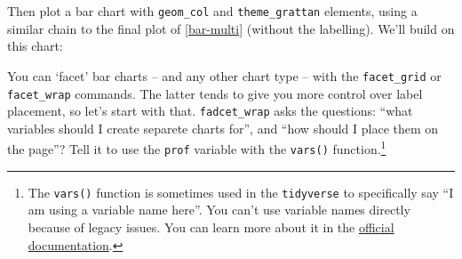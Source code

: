 \documentclass[]{book}
\newenvironment{Shaded}{\begin{snugshade}}{\end{snugshade}}
\newcommand{\DataTypeTok}[1]{\textcolor[rgb]{0.13,0.29,0.53}{#1}}
\newcommand{\DecValTok}[1]{\textcolor[rgb]{0.00,0.00,0.81}{#1}}
\newcommand{\FloatTok}[1]{\textcolor[rgb]{0.00,0.00,0.81}{#1}}
\newcommand{\KeywordTok}[1]{\textcolor[rgb]{0.13,0.29,0.53}{\textbf{#1}}}
\newcommand{\NormalTok}[1]{#1}
\newcommand{\OperatorTok}[1]{\textcolor[rgb]{0.81,0.36,0.00}{\textbf{#1}}}
\newcommand{\OtherTok}[1]{\textcolor[rgb]{0.56,0.35,0.01}{#1}}
\newcommand{\StringTok}[1]{\textcolor[rgb]{0.31,0.60,0.02}{#1}}
\let\rmarkdownfootnote\footnote%
\def\footnote{\protect\rmarkdownfootnote}
\begin{document}
Then plot a bar chart with \texttt{geom\_col} and \texttt{theme\_grattan} elements, using a similar chain to the final plot of \ref{bar-multi} (without the labelling). We'll build on this chart:

\begin{Shaded}
\end{Shaded}

You can `facet' bar charts -- and any other chart type -- with the \texttt{facet\_grid} or \texttt{facet\_wrap} commands. The latter tends to give you more control over label placement, so let's start with that. \texttt{fadcet\_wrap} asks the questions: ``what variables should I create separete charts for'', and ``how should I place them on the page''? Tell it to use the \texttt{prof} variable with the \texttt{vars()} function.\footnote{The \texttt{vars()} function is sometimes used in the \texttt{tidyverse} to specifically say ``I am using a variable name here''. You can't use variable names directly because of legacy issues. You can learn more about it in the \href{https://ggplot2.tidyverse.org/reference/facet_wrap.html}{official documentation}.}
\end{document}
